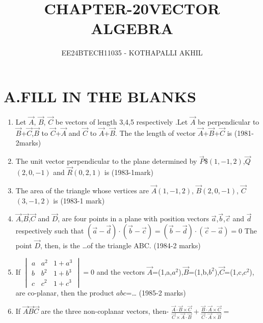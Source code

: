 \documentclass[journal]{IEEEtran}
\numberwithin{equation}{enumi}
\numberwithin{figure}{enumi}
\begin{document}


\title{CHAPTER-20}
\title{VECTOR ALGEBRA}
\author{EE24BTECH11035 - KOTHAPALLI AKHIL}
{\let\newpage\relax\maketitle}

\section*{A.FILL IN THE BLANKS}
\begin{enumerate}
    \item Let $\Vec{A}$, $\vec{B}$, $\vec{C}$ be vectors of length 3,4,5 respectively .Let $\vec{A}$ be perpendicular to $\vec{B}$+$\vec{C}$,$\vec{B}$ to $\vec{C}$+$\vec{A}$ and $\vec{C}$ to $\vec{A}$+$\vec{B}$. The the length of vector $\vec{A}$+$\vec{B}$+$\vec{C}$ is
    \hfill{(1981-2marks)}
    \item The unit vector perpendicular to the plane determined by $\vec{P}$$\$(1,-1,2)$,$\vec{Q}$$(2,0,-1)$ and $\vec{R}$$(0,2,1)$ is
    \hfill{(1983-1mark)}
    \item The area of the triangle whose vertices are $\vec{A}$$(1,-1,2)$, $\vec{B}$$(2,0,-1)$, $\vec{C}$$(3,-1,2)$ is
    \hfill{(1983-1 mark)}
    \item $\vec{A}$,$\vec{B}$,$\vec{C}$ and $\vec{D}$, are four points in a plane with position vectors $\vec{a}$,$\vec{b}$,$\vec{c}$ and $\vec{d}$ respectively such that $(\vec{a}-\vec{d})\cdot(\vec{b}-\vec{c})=(\vec{b}-\vec{d})\cdot(\vec{c}-\vec{a})=0$
    The point $\vec{D}$, then, is the \dots of the triangle ABC.
    \hfill{(1984-2 marks)}
    \item If $ 
 \begin{vmatrix}
a & a^2 & 1+a^3\\
b & b^2 & 1+b^3\\
c & c^2 & 1+c^3
\end{vmatrix}
=0$ and the vectors $\vec{A}$=(1,a,$a^2$),$\vec{B}$=(1,b,$b^2$),$\vec{C}$=(1,c,$c^2$), are co-planar, then the product $abc$=\dots
\hfill{(1985-2 marks)}
\item If $\vec{A}$$\vec{B}$$\vec{C}$ are the three non-coplanar vectors, then- $\frac{\vec{A}\cdot\vec{B}\times\vec{C}}{\vec{C}\times\vec{A}\cdot\vec{B}}+\frac{\vec{B}\cdot\vec{A}\times\vec{C}}{\vec{C}\cdot\vec{A}\times\vec{B}}=$

\end{enumerate}
\end{document}

